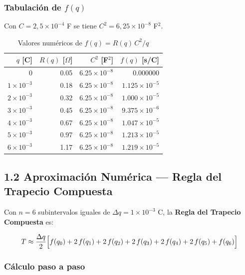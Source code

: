 \documentclass[12pt,a4paper]{article}
\begin{document}
\subsubsection*{Tabulación de $f(q)$}

Con $C = 2{,}5\times10^{-4}$ F se tiene $C^2 = 6{,}25\times10^{-8}$ F$^2$.

\begin{table}[H]
    \centering
    \caption{Valores numéricos de $f(q) = R(q)\,C^2/q$}
    \label{tab:fq}
    \begin{tabular}{rrrr}
        \toprule
        $q$ [C] & $R(q)$ [$\Omega$] & $C^2$ [F$^2$] & $f(q)$ [s/C] \\
        \midrule
        $0$                  & 0.05 & $6.25\times10^{-8}$ & 0.000000 \\
        $1\times10^{-3}$     & 0.18 & $6.25\times10^{-8}$ & $1.125\times10^{-5}$ \\
        $2\times10^{-3}$     & 0.32 & $6.25\times10^{-8}$ & $1.000\times10^{-5}$ \\
        $3\times10^{-3}$     & 0.45 & $6.25\times10^{-8}$ & $9.375\times10^{-6}$ \\
        $4\times10^{-3}$     & 0.67 & $6.25\times10^{-8}$ & $1.047\times10^{-5}$ \\
        $5\times10^{-3}$     & 0.97 & $6.25\times10^{-8}$ & $1.213\times10^{-5}$ \\
        $6\times10^{-3}$     & 1.17 & $6.25\times10^{-8}$ & $1.219\times10^{-5}$ \\
        \bottomrule
    \end{tabular}
\end{table}

\subsection{1.2 Aproximación Numérica --- Regla del Trapecio Compuesta}

Con $n=6$ subintervalos iguales de $\Delta q = 1\times10^{-3}$ C, la
\textbf{Regla del Trapecio Compuesta} es:

\begin{equation}
    T \approx \frac{\Delta q}{2}
    \Bigl[f(q_0) + 2\,f(q_1) + 2\,f(q_2) + 2\,f(q_3)
         + 2\,f(q_4) + 2\,f(q_5) + f(q_6)\Bigr]
    \label{eq:trapecio}
\end{equation}

\subsubsection*{Cálculo paso a paso}
\end{document}
